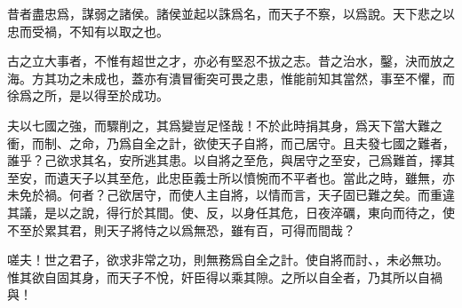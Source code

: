 昔者盡忠爲，謀弱之諸侯。諸侯並起以誅爲名，而天子不察，以爲說。天下悲之以忠而受禍，不知有以取之也。%

古之立大事者，不惟有超世之才，亦必有堅忍不拔之志。昔之治水，鑿，決而放之海。方其功之未成也，蓋亦有潰冒衝突可畏之患，惟能前知其當然，事至不懼，而徐爲之所，是以得至於成功。%

夫以七國之強，而驟削之，其爲變豈足怪哉！不於此時捐其身，爲天下當大難之衝，而制、之命，乃爲自全之計，欲使天子自將，而己居守。且夫發七國之難者，誰乎？己欲求其名，安所逃其患。以自將之至危，與居守之至安，己爲難首，擇其至安，而遺天子以其至危，此忠臣義士所以憤惋而不平者也。當此之時，雖無，亦未免於禍。何者？己欲居守，而使人主自將，以情而言，天子固已難之矣。而重違其議，是以之說，得行於其間。使、反，以身任其危，日夜淬礪，東向而待之，使不至於累其君，則天子將恃之以爲無恐，雖有百，可得而間哉？%

嗟夫！世之君子，欲求非常之功，則無務爲自全之計。使自將而討、，未必無功。惟其欲自固其身，而天子不悅，奸臣得以乘其隙。之所以自全者，乃其所以自禍與！

\theendnotes

